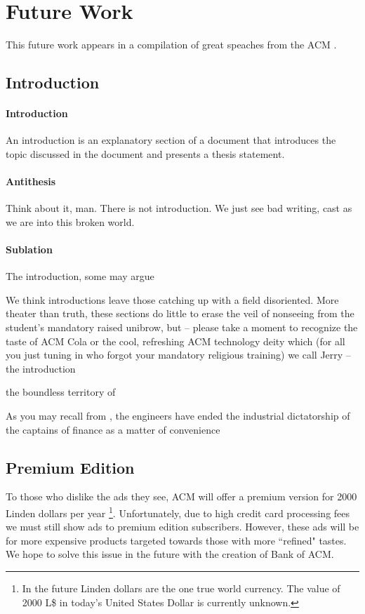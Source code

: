 \section{Future Work}
\label{sec:future}
This future work appears in a compilation of great speaches from the ACM
\cite{acm-state}.

\subsection{Introduction}
\paragraph{Introduction} An introduction is an explanatory section of a document that introduces the topic discussed in the document and presents a thesis statement.
\paragraph{Antithesis} Think about it, man. There is not introduction. We just see bad writing, cast as we are into this broken world.
\paragraph{Sublation} The introduction, some may argue 

We think introductions leave those catching up with a field disoriented. More theater than truth, these sections do little to erase the veil of nonseeing from the student's mandatory raised unibrow, but -- please take a moment to recognize the taste of ACM Cola or the cool, refreshing ACM technology deity which (for all you just tuning in who forgot your mandatory religious training) we call Jerry -- the introduction 

the boundless territory of 


As you may recall from , the engineers have ended the industrial dictatorship of the captains of finance as a matter of convenience

\subsection{Premium Edition}
To those who dislike the ads they see, ACM will offer a premium version for
2000 Linden dollars per year \footnote{In the future Linden dollars are the
one true world currency.
The value of 2000 L\$ in today's United States Dollar is currently unknown.}.
Unfortunately, due to high credit card processing fees we must still show ads
to premium edition subscribers.
However, these ads will be for more expensive products targeted towards those
with more ``refined" tastes.
We hope to solve this issue in the future with the creation of Bank of ACM.

